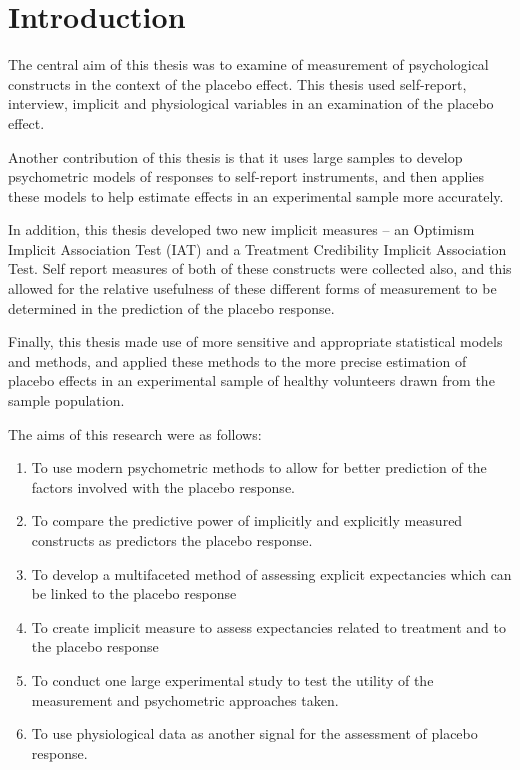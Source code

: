 \chapter{Introduction}


The central aim of this thesis was to examine of measurement of psychological constructs in the context of the placebo effect. This thesis used self-report, interview, implicit and physiological variables in an examination of the placebo effect. 


Another contribution of this thesis is that it uses large samples to develop psychometric models of responses to self-report instruments, and then applies these models to help estimate effects in an experimental sample more accurately. 

In addition, this thesis developed two new implicit measures -- an Optimism Implicit Association Test (IAT) and a Treatment Credibility Implicit Association Test. Self report measures of both of these constructs were collected also, and this allowed for the relative usefulness of these different forms of measurement to be determined in the prediction of the placebo response. 

Finally, this thesis  made use of more sensitive and appropriate statistical models and methods, and applied these methods to the more precise estimation of placebo effects in an experimental sample of healthy volunteers drawn from the sample population. 


The aims of this research were as follows:


\begin{enumerate}

\item To use modern psychometric methods to allow for better prediction of the factors involved with the placebo response. 

\item To compare the predictive power of implicitly and explicitly measured constructs as predictors the placebo response. 

\item To develop a multifaceted method of assessing explicit expectancies which can be linked to the placebo response

\item To create implicit measure to assess expectancies related to treatment and to the placebo response

\item To conduct one large experimental study to test the utility of the measurement and psychometric approaches taken. 

\item To use physiological data as another signal for the assessment of placebo response. 
\end{enumerate}

